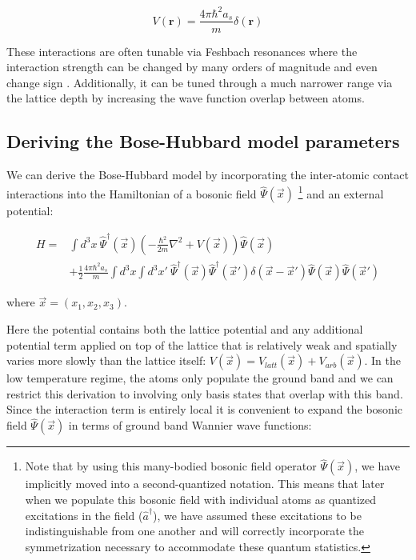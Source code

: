 \begin{equation}
\label{eqn:UCPot}
V(\textbf{r})=\frac{4 \pi \hbar^2 a_s}{m} \delta (\textbf{r})
\end{equation}

These interactions are often tunable via Feshbach resonances where the interaction strength can be changed by many orders of magnitude and even change sign \cite{Chin2010}. Additionally, it can be tuned through a much narrower range via the lattice depth by increasing the wave function overlap between atoms.

\subsection{Deriving the Bose-Hubbard model parameters}
\label{sec:ch1HO}

We can derive the Bose-Hubbard model by incorporating the inter-atomic contact interactions into the Hamiltonian of a bosonic field $\hat{\Psi}(\vec{x})$ \footnote{Note that by using this many-bodied bosonic field operator $\hat{\Psi}(\vec{x})$, we have implicitly moved into a second-quantized notation. This means that later when we populate this bosonic field with individual atoms as quantized excitations in the field ($\hat{a}^\dagger$), we have assumed these excitations to be indistinguishable from one another and will correctly incorporate the symmetrization necessary to accommodate these quantum statistics.} and an external potential:

\begin{equation}
\begin{aligned}
H =  & \int d^3 x~\hat{\Psi}^\dagger (\vec{x}) \left ( -\frac{\hbar^2}{2m} \nabla^2 + V(\vec{x}) \right ) \hat{\Psi}(\vec{x}) ~\\
& + \frac{1}{2} \frac{4 \pi \hbar^2 a_s}{m} \int d^3 x \int d^3 x' ~\hat{\Psi}^\dagger (\vec{x}) \hat{\Psi}^\dagger (\vec{x}') \delta(\vec{x}-\vec{x}') \hat{\Psi} (\vec{x}) \hat{\Psi} (\vec{x}')
\end{aligned}
\label{eqn:BHHL}
\end{equation} 

where $\vec{x}=\left ( x_1, x_2, x_3 \right )$.

Here the potential contains both the lattice potential and any additional potential term applied on top of the lattice that is relatively weak and spatially varies more slowly than the lattice itself: $V(\vec{x})=V_{latt}(\vec{x}) + V_{arb}(\vec{x})$. In the low temperature regime, the atoms only populate the ground band and we can restrict this derivation to involving only basis states that overlap with this band. Since the interaction term is entirely local it is convenient to expand the bosonic field $\hat{\Psi}(\vec{x})$ in terms of ground band Wannier wave functions:

